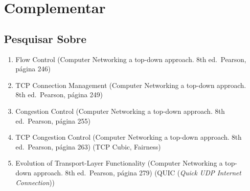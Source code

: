 \hypertarget{complementar-5}{%
\section{Complementar}\label{complementar-5}}

\hypertarget{pesquisar-sobre-4}{%
\subsection{Pesquisar Sobre}\label{pesquisar-sobre-4}}

\begin{enumerate}
\def\labelenumi{\arabic{enumi}.}
\tightlist
\item
  Flow Control (Computer Networking a top-down approach. 8th
  ed.~Pearson, página 246)
\item
  TCP Connection Management (Computer Networking a top-down approach.
  8th ed.~Pearson, página 249)
\item
  Congestion Control (Computer Networking a top-down approach. 8th
  ed.~Pearson, página 255)
\item
  TCP Congestion Control (Computer Networking a top-down approach. 8th
  ed.~Pearson, página 263) (TCP Cubic, Fairness)
\item
  Evolution of Transport-Layer Functionality (Computer Networking a
  top-down approach. 8th ed.~Pearson, página 279) (QUIC (\emph{Quick UDP
  Internet Connection}))
\end{enumerate}